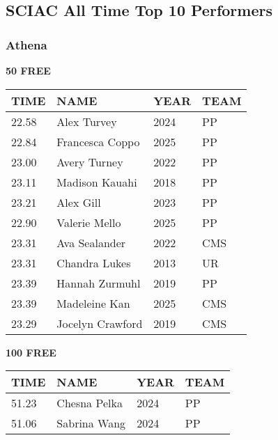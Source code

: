 
\newpage

\subsection{SCIAC All Time Top 10 Performers}
\subsubsection{Athena}

\begin{table}[H]
\centering
\begin{minipage}[t]{0.48\textwidth}
\centering
\textbf{50 FREE}\\[0.1cm]
\begin{tabular}{@{}p{1.8cm}p{2.8cm}p{1.2cm}p{1.4cm}@{}}
\hline
    \textbf{TIME} & \textbf{NAME} & \textbf{YEAR} & \textbf{TEAM} \\
\hline
    22.58 & Alex Turvey & 2024 & PP \\
    22.84 & Francesca Coppo & 2025 & PP \\
    23.00 & Avery Turney & 2022 & PP \\
    23.11 & Madison Kauahi & 2018 & PP \\
    23.21 & Alex Gill & 2023 & PP \\
    22.90 & Valerie Mello & 2025 & PP \\
    23.31 & Ava Sealander & 2022 & CMS \\
    23.31 & Chandra Lukes & 2013 & UR \\
    23.39 & Hannah Zurmuhl & 2019 & PP \\
    23.39 & Madeleine Kan & 2025 & CMS \\
    23.29 & Jocelyn Crawford & 2019 & CMS \\
\hline
\end{tabular}
\end{minipage}\hfill
\begin{minipage}[t]{0.48\textwidth}
\centering
\textbf{100 FREE}\\[0.1cm]
\begin{tabular}{@{}p{1.8cm}p{2.8cm}p{1.2cm}p{1.4cm}@{}}
\hline
    \textbf{TIME} & \textbf{NAME} & \textbf{YEAR} & \textbf{TEAM} \\
\hline
    51.23 & Chesna Pelka & 2024 & PP \\
    51.06 & Sabrina Wang & 2024 & PP \\

\end{tabular}
\end{minipage}
\end{table}
